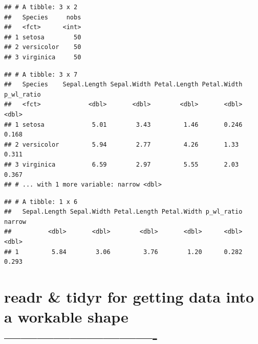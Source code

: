 \documentclass[]{article}
\newenvironment{Shaded}{\begin{snugshade}}{\end{snugshade}}
\newcommand{\CommentTok}[1]{\textcolor[rgb]{0.56,0.35,0.01}{\textit{#1}}}
\newcommand{\KeywordTok}[1]{\textcolor[rgb]{0.13,0.29,0.53}{\textbf{#1}}}
\newcommand{\NormalTok}[1]{#1}
\newcommand{\OperatorTok}[1]{\textcolor[rgb]{0.81,0.36,0.00}{\textbf{#1}}}
\newcommand{\StringTok}[1]{\textcolor[rgb]{0.31,0.60,0.02}{#1}}
\begin{document}
\begin{verbatim}
## # A tibble: 3 x 2
##   Species     nobs
##   <fct>      <int>
## 1 setosa        50
## 2 versicolor    50
## 3 virginica     50
\end{verbatim}

\begin{Shaded}
\end{Shaded}

\begin{verbatim}
## # A tibble: 3 x 7
##   Species    Sepal.Length Sepal.Width Petal.Length Petal.Width p_wl_ratio
##   <fct>             <dbl>       <dbl>        <dbl>       <dbl>      <dbl>
## 1 setosa             5.01        3.43         1.46       0.246      0.168
## 2 versicolor         5.94        2.77         4.26       1.33       0.311
## 3 virginica          6.59        2.97         5.55       2.03       0.367
## # ... with 1 more variable: narrow <dbl>
\end{verbatim}

\begin{Shaded}
\end{Shaded}

\begin{verbatim}
## # A tibble: 1 x 6
##   Sepal.Length Sepal.Width Petal.Length Petal.Width p_wl_ratio narrow
##          <dbl>       <dbl>        <dbl>       <dbl>      <dbl>  <dbl>
## 1         5.84        3.06         3.76        1.20      0.282  0.293
\end{verbatim}

\hypertarget{readr-tidyr-for-getting-data-into-a-workable-shape--}{%
\section{readr \& tidyr for getting data into a workable shape
----------------------------}\label{readr-tidyr-for-getting-data-into-a-workable-shape--}}
\end{document}
